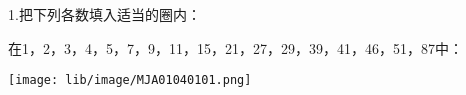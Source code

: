 \question 1.把下列各数填入适当的圈内：

在1，2，3，4，5，7，9，11，15，21，27，29，39，41，46，51，87中：

\texttt{[image: lib/image/MJA01040101.png]}